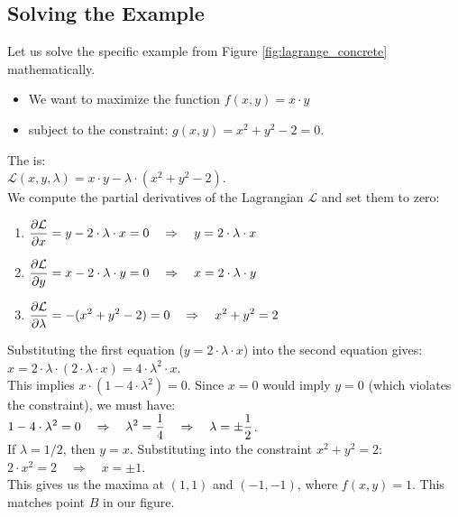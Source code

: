 \subsection{Solving the Example}
Let us solve the specific example from Figure \ref{fig:lagrange_concrete} mathematically.
\begin{itemize}
    \item We want to maximize the function $f(x, y) = x \cdot y$
    \item subject to the constraint: $g(x, y) = x^2 + y^2 - 2 = 0$.
\end{itemize}
The  is:
\\[0.2cm]
\hspace*{1.3cm}
$\mathcal{L}(x, y, \lambda) = x \cdot y - \lambda \cdot (x^2 + y^2 - 2)$.
\\[0.2cm]
We compute the partial derivatives of the Lagrangian $\mathcal{L}$ and set them to zero:
\begin{enumerate}
    \item $\displaystyle \frac{\partial \mathcal{L}}{\partial x} = y - 2\cdot\lambda\cdot x = 0 \quad \Rightarrow \quad y = 2\cdot\lambda\cdot x$
    \item $\displaystyle \frac{\partial \mathcal{L}}{\partial y} = x - 2\cdot\lambda\cdot y = 0 \quad \Rightarrow \quad x = 2\cdot\lambda\cdot y$
    \item $\displaystyle \frac{\partial \mathcal{L}}{\partial \lambda} = -(x^2 + y^2 - 2) = 0 \quad \Rightarrow \quad x^2 + y^2 = 2$
\end{enumerate}
Substituting the first equation ($y=2\cdot\lambda\cdot x$) into the second equation gives:
\\[0.2cm]
\hspace*{1.3cm}
$x = 2\cdot\lambda\cdot(2\cdot\lambda\cdot x) = 4\cdot\lambda^2\cdot x$.
\\[0.2cm]
This implies $x\cdot(1 - 4\cdot\lambda^2) = 0$. Since $x=0$ would imply $y=0$ (which violates the constraint), we must have:
\\[0.2cm]
\hspace*{1.3cm}
$\displaystyle1 - 4\cdot\lambda^2 = 0 \quad \Rightarrow \quad \lambda^2 = \frac{1}{4} \quad \Rightarrow \quad \lambda = \pm \frac{1}{2}$.
\\[0.2cm]
If $\lambda = 1/2$, then $y = x$. Substituting into the constraint $x^2 + y^2 = 2$:
\\[0.2cm]
\hspace*{1.3cm}
$2\cdot x^2 = 2 \quad \Rightarrow \quad x = \pm 1$.
\\[0.2cm]
This gives us the maxima at $(1,1)$ and $(-1,-1)$, where $f(x,y)=1$.
This matches point $B$ in our figure.

